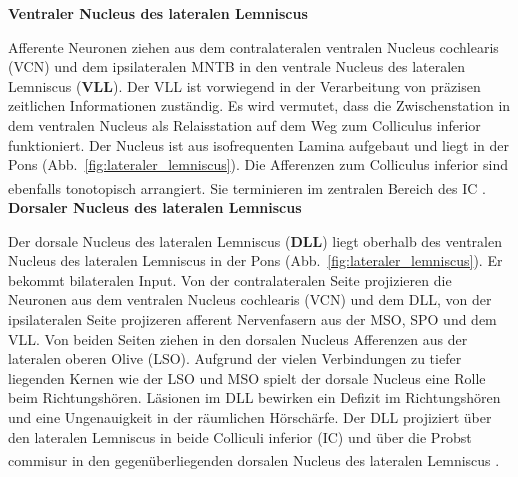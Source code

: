 \documentclass[12pt,a4paper,pdftex]{article}
\begin{document}
\textbf{Ventraler Nucleus des lateralen Lemniscus}

Afferente Neuronen ziehen aus dem contralateralen ventralen Nucleus cochlearis (VCN) und dem ipsilateralen MNTB in den ventrale Nucleus des lateralen Lemniscus (\textbf{VLL}). Der VLL ist vorwiegend in der Verarbeitung von präzisen zeitlichen Informationen zuständig.
Es wird vermutet, dass die Zwischenstation in dem ventralen Nucleus als Relaisstation auf dem Weg zum Colliculus inferior funktioniert.
Der Nucleus ist aus isofrequenten Lamina aufgebaut und liegt in der Pons (Abb.~\ref{fig:lateraler_lemniscus}). Die Afferenzen zum Colliculus inferior sind ebenfalls tonotopisch arrangiert. Sie terminieren im zentralen Bereich des IC \textsuperscript{\cite[29]{paxinos2014rat}}.
\\

\textbf{Dorsaler Nucleus des lateralen Lemniscus}

Der dorsale Nucleus des lateralen Lemniscus (\textbf{DLL}) liegt oberhalb des ventralen Nucleus des lateralen Lemniscus in der Pons (Abb.~\ref{fig:lateraler_lemniscus}). Er bekommt bilateralen Input. Von der contralateralen Seite projizieren die Neuronen aus dem ventralen Nucleus cochlearis (VCN) und dem DLL, von der ipsilateralen Seite projizeren afferent Nervenfasern aus der MSO, SPO und dem VLL. Von beiden Seiten ziehen in den dorsalen Nucleus Afferenzen aus der lateralen oberen Olive (LSO).
Aufgrund der vielen Verbindungen zu tiefer liegenden Kernen wie der LSO und MSO spielt der dorsale Nucleus eine Rolle beim Richtungshören. Läsionen im DLL bewirken ein Defizit im Richtungshören und eine Ungenauigkeit in der räumlichen Hörschärfe. 
Der DLL projiziert über den lateralen Lemniscus in beide Colliculi inferior (IC) und über die Probst commisur in den gegenüberliegenden dorsalen Nucleus des lateralen Lemniscus
\textsuperscript{\cite[29]{paxinos2014rat}}.
\\
\end{document}

